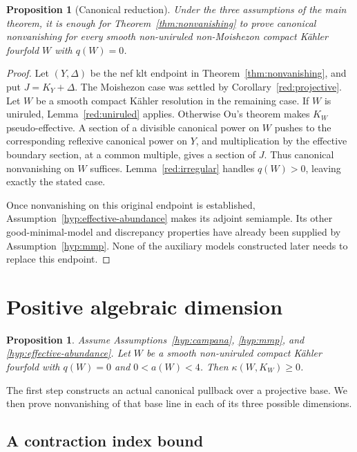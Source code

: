 \documentclass[11pt,letterpaper]{article}
\newtheorem{proposition}[theorem]{Proposition}
\theoremstyle{definition}
\theoremstyle{remark}
\begin{document}
\begin{proposition}[Canonical reduction]\label{red:reduction}
Under the three assumptions of the main theorem, it is enough for
Theorem~\ref{thm:nonvanishing} to prove canonical nonvanishing for every
smooth non-uniruled non-Moishezon compact Kähler fourfold \(W\) with
\(q(W)=0\).
\end{proposition}

\begin{proof}
Let \((Y,\Delta)\) be the nef klt endpoint in
Theorem~\ref{thm:nonvanishing}, and put \(J=K_Y+\Delta\). The
Moishezon case was settled by Corollary~\ref{red:projective}. Let
\(W\) be a smooth compact Kähler resolution in the remaining case.
If \(W\) is uniruled, Lemma~\ref{red:uniruled} applies. Otherwise
Ou's theorem makes \(K_W\) pseudo-effective. A section of a divisible
canonical power on \(W\) pushes to the corresponding reflexive
canonical power on \(Y\), and multiplication by the effective boundary
section, at a common multiple, gives a section of \(J\). Thus canonical
nonvanishing on \(W\) suffices. Lemma~\ref{red:irregular} handles
\(q(W)>0\), leaving exactly the stated case.

Once nonvanishing on this original endpoint is established,
Assumption~\ref{hyp:effective-abundance} makes its adjoint semiample.
Its other good-minimal-model and discrepancy properties have already
been supplied by Assumption~\ref{hyp:mmp}. None of the auxiliary
models constructed later needs to replace this endpoint.
\end{proof}

\section{Positive algebraic dimension}
\label{pos:section}

\begin{proposition}\label{pos:nonvanishing}
Assume Assumptions~\ref{hyp:campana}, \ref{hyp:mmp}, and
\ref{hyp:effective-abundance}. Let \(W\) be a smooth non-uniruled
compact Kähler fourfold with \(q(W)=0\) and \(0<a(W)<4\). Then
\(\kappa(W,K_W)\geq0\).
\end{proposition}

The first step constructs an actual canonical pullback over a
projective base. We then prove nonvanishing of that base line in each
of its three possible dimensions.

\subsection{A contraction index bound}
\end{document}
